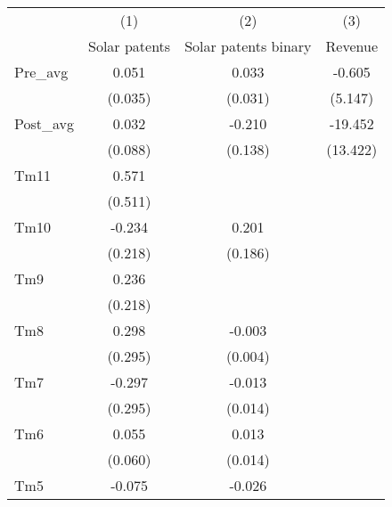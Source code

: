 {
\def\sym#1{\ifmmode^{#1}\else\(^{#1}\)\fi}
\begin{tabular}{l*{3}{c}}
\hline\hline
                    &\multicolumn{1}{c}{(1)}&\multicolumn{1}{c}{(2)}&\multicolumn{1}{c}{(3)}\\
                    &\multicolumn{1}{c}{Solar patents}&\multicolumn{1}{c}{Solar patents binary}&\multicolumn{1}{c}{Revenue}\\
\hline
Pre\_avg             &       0.051         &       0.033         &      -0.605         \\
                    &     (0.035)         &     (0.031)         &     (5.147)         \\
[1em]
Post\_avg            &       0.032         &      -0.210         &     -19.452         \\
                    &     (0.088)         &     (0.138)         &    (13.422)         \\
[1em]
Tm11                &       0.571         &                     &                     \\
                    &     (0.511)         &                     &                     \\
[1em]
Tm10                &      -0.234         &       0.201         &                     \\
                    &     (0.218)         &     (0.186)         &                     \\
[1em]
Tm9                 &       0.236         &                     &                     \\
                    &     (0.218)         &                     &                     \\
[1em]
Tm8                 &       0.298         &      -0.003         &                     \\
                    &     (0.295)         &     (0.004)         &                     \\
[1em]
Tm7                 &      -0.297         &      -0.013         &                     \\
                    &     (0.295)         &     (0.014)         &                     \\
[1em]
Tm6                 &       0.055         &       0.013         &                     \\
                    &     (0.060)         &     (0.014)         &                     \\
[1em]
Tm5                 &      -0.075         &      -0.026         &                     \\

\end{tabular}}
